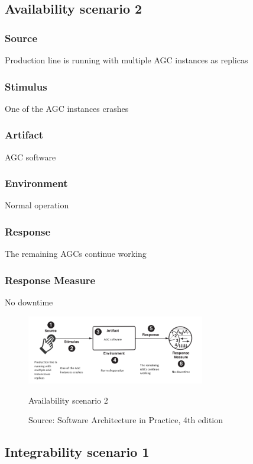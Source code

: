 \subsection{Availability scenario 2}

\subsubsection{Source}
Production line is running with multiple AGC instances as replicas

\subsubsection{Stimulus}
One of the AGC instances crashes

\subsubsection{Artifact}
AGC software

\subsubsection{Environment}
Normal operation

\subsubsection{Response}
The remaining AGCs continue working

\subsubsection{Response Measure}
No downtime

\begin{figure}[ht]
\centering
  \includegraphics[height=3cm]{images/qa_scenario_agc_downtime.png}
  \caption{Availability scenario 2}
  \caption*{Source: Software Architecture in Practice, 4th edition \cite{bass2021software}}
  \label{fig:qa_availability_scenario_2}
\end{figure}

\subsection{Integrability scenario 1}

